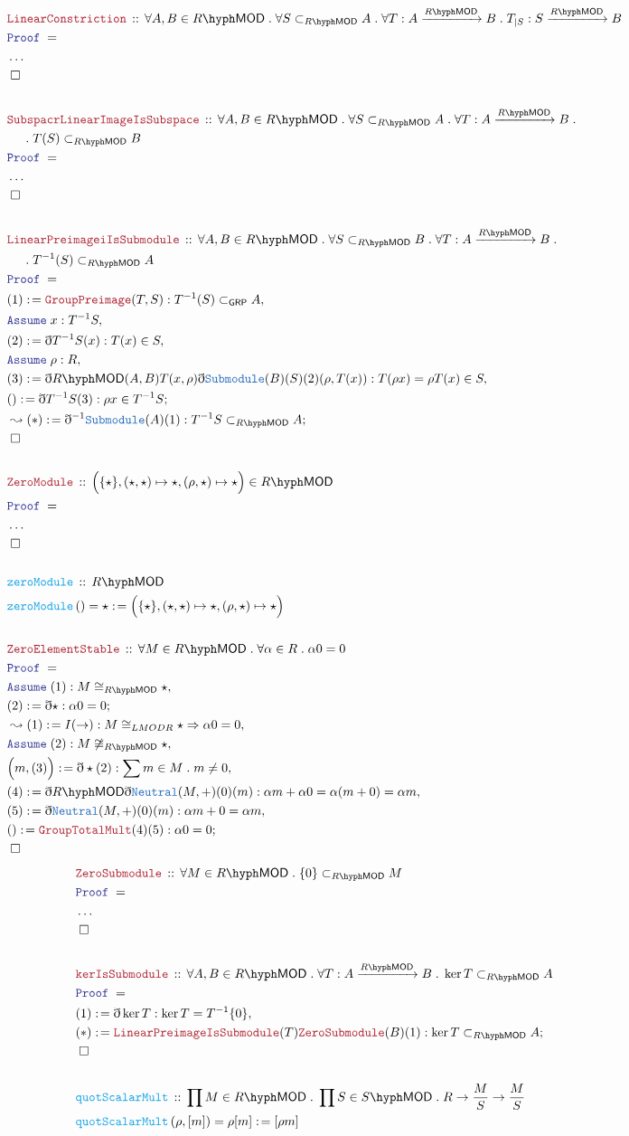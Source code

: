 \documentclass[12pt]{scrartcl}
\newcommand{\TYPE}[1]{\textcolor{NavyBlue}{\mathtt{#1}}}
\newcommand{\FUNC}[1]{\textcolor{Cerulean}{\mathtt{#1}}}
\newcommand{\LOGIC}[1]{\textcolor{Blue}{\mathtt{#1}}}
\newcommand{\THM}[1]{\textcolor{Maroon}{\mathtt{#1}}}
\renewcommand{\.}{\; . \;}
\newcommand{\de}{: \kern 0.1pc =}
\newcommand{\Act}[1]{\left(#1\right)}
\newcommand{\Theorem}[2]{& \THM{#1} \, :: \, #2 \\ & \Proof = \\ }
\newcommand{\DeclareFunc}[2]{& \FUNC{#1} \, :: \, #2 \\}
\newcommand{\DefineNamedFunc}[4]{&  \FUNC{#1}\Act{#2} = #3 \de #4 \\}
\newcommand{\NewLine}{\\ & \kern 1pc}
\newcommand{\Page}[1]{ \begin{align*} #1 \end{align*}   }
\newcommand{ \bd }{ \ByDef }
\newcommand{\NoProof}{ & \ldots \\ \EndProof}
\newcommand{\Say}[3]{& #1 \de #2 : #3, \\}
\newcommand{\Conclude}[3]{& #1 \de #2 : #3; \\}
\newcommand{\Derive}[3]{& \leadsto #1 \de #2 : #3, \\}
\newcommand{\DeriveConclude}[3]{& \leadsto #1 \de #2 : #3 ; \\}
\newcommand{\Assume}[2]{& \LOGIC{Assume} \; #1 : #2, \\}
\newcommand{\QED}{\; \square}
\newcommand{\EndProof}{& \QED \\}
\newcommand{\ByDef}{\eth}
\newcommand{\Proof}{\LOGIC{Proof} \; }
\newcommand{\Arrow}[1]{\xrightarrow{#1}}
\newcommand{\Sgrp}{\subset_{\mathsf{GRP}}}
\newcommand{\submod}[1]{\subset_{\LMOD{#1}}}
\newcommand{\LMOD}[1]{#1\hyph\mathsf{MOD}}
\begin{document}
\Page{
	\Theorem{LinearConstriction}{\forall A,B \in \LMOD{R} \. \forall S \submod{R} A \.   
		\forall T : A \Arrow{\LMOD{R}} B \. T_{|S} : S \Arrow{\LMOD{R}} B}
	\NoProof
	\\
	\Theorem{SubspacrLinearImageIsSubspace}{\forall A,B \in \LMOD{R} \. \forall S \submod{R} A \. 
		\forall T : A \Arrow{\LMOD{R}} B \.  \NewLine \. T(S) \submod{R} B
	}
	\NoProof
	\\
	\Theorem{LinearPreimageiIsSubmodule}{\forall A,B \in \LMOD{R} \. \forall S \submod{R} B \. 
		\forall T : A \Arrow{\LMOD{R}} B \. \NewLine \. T^{-1}(S) \submod{R} A }
	\Say{(1)}{\THM{GroupPreimage}(T,S)}{T^{-1}(S) \Sgrp A}
	\Assume{x}{T^{-1}S}
	\Say{(2)}{\bd T^{-1}S(x)}{T(x) \in S}
	\Assume{\rho}{R}
	\Say{(3) }{\bd \LMOD{R}(A,B)T(x,\rho) \bd \TYPE{Submodule}(B)(S)(2)(\rho,T(x))}{ T(\rho x) = \rho T(x) \in S}
	\Conclude{()}{\bd T^{-1}S(3)}{\rho x \in T^{-1}S}
	\DeriveConclude{(*)}{\bd^{-1}\TYPE{Submodule}(A)(1)}{ T^{-1}S \submod{R} A}
	\EndProof
	\\
	\Theorem{ZeroModule}{\Big(\{\star\},(\star,\star)\mapsto \star, (\rho,\star) \mapsto \star\Big) \in \LMOD{R}}
	\NoProof
	\\
	\DeclareFunc{zeroModule}{\LMOD{R}}
	\DefineNamedFunc{zeroModule}{}{\star}{\Big(\{\star\},(\star,\star)\mapsto \star, (\rho,\star) \mapsto \star\Big) }
	\\
	\Theorem{ZeroElementStable}{\forall M \in \LMOD{R} \. \forall \alpha \in R \. \alpha 0 = 0 }
	\Assume{(1)}{M \cong_{\LMOD{R}} \star }
	\Conclude{(2)}{\bd \star}{\alpha 0 = 0}
	\Derive{(1)}{I(\rightarrow)}{M \cong_{LMOD{R}} \star \Rightarrow \alpha 0 = 0 }
	\Assume{(2)}{M \not \cong_{\LMOD{R}} \star}
	\Say{\Big(m,(3)\Big)}{\bd \star (2)}{\sum m \in M \. m \neq 0}
	\Say{(4)}{\bd \LMOD{R}\bd \TYPE{Neutral}(M,+)(0)(m)}{ \alpha m + \alpha 0 = \alpha(m + 0) = \alpha m  }
	\Say{(5)}{ \bd \TYPE{Neutral}(M,+)(0)(m) }{  \alpha m + 0 = \alpha m   }
	\Conclude{()}{\THM{GroupTotalMult}(4)(5) }{ \alpha 0 = 0 }
	\EndProof
}\Page{
	\Theorem{ZeroSubmodule}{\forall M \in \LMOD{R} \. \{0\} \submod{R} M }
	\NoProof
	\\
	\Theorem{kerIsSubmodule}{\forall A,B \in \LMOD{R} \. \forall T : A \Arrow{\LMOD{R}} B \. \ker T \submod{R} A}
	\Say{(1)}{\bd \ker T}{ \ker T = T^{-1}\{0\}}
	\Conclude{(*)}{\THM{LinearPreimageIsSubmodule}(T)\THM{ZeroSubmodule}(B)(1)}{\ker T \submod{R} A}
	\EndProof
	\\
	\DeclareFunc{quotScalarMult}{  \prod M \in \LMOD{R} \. \prod S \in \LMOD{S} \. R \to \frac{M}{S} \to \frac{M}{S}}
	\DefineNamedFunc{quotScalarMult}{\rho,[m]}{\rho[m]}{[\rho m]}
}
\end{document}
